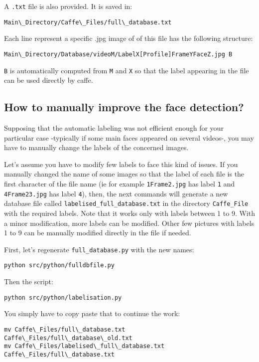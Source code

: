 A \texttt{.txt} file is also provided. It is saved in:\\
\begin{verbatim}
Main\_Directory/Caffe\_Files/full\_database.txt
\end{verbatim}
Each line represent a specific .jpg image of of this file has the following structure:\\
\begin{verbatim}
Main\_Directory/Database/videoM/LabelX[Profile]FrameYFaceZ.jpg B
\end{verbatim}
\texttt{B} is automatically computed from \texttt{M} and \texttt{X} so that the label appearing in the file can be used directly by caffe.

\subsection{How to manually improve the face detection?}

Supposing that the automatic labeling was not efficient enough for your particular case -typically if some main faces appeared on several videos-, you may have to manually change the labels of the concerned images.

Let’s assume you have to modify few labels to face this kind of issues. If you manually changed the name of some images so that the label of each file is the first character of the file name (ie for example \texttt{1Frame2.jpg} has label \texttt{1} and \texttt{4Frame23.jpg} has label \texttt{4}), then, the next commands will generate a new database file called \texttt{labelised\_full\_database.txt} in the directory \texttt{Caffe\_File} with the required labels. Note that it works only with labels between 1 to 9. With a minor modification, more labels can be modified. Other few pictures with labels 1 to 9 can be manually modified directly in the file if needed.


First, let’s regenerate \texttt{full\_database.py} with the new names:
\begin{verbatim}
python src/python/fulldbfile.py
\end{verbatim}
Then the script:
\begin{verbatim}
python src/python/labelisation.py
\end{verbatim}
You simply have to copy paste that to continue the work:
\begin{verbatim}
mv Caffe\_Files/full\_database.txt Caffe\_Files/full\_database\_old.txt
mv Caffe\_Files/labelised\_full\_database.txt Caffe\_Files/full\_database.txt
\end{verbatim}
